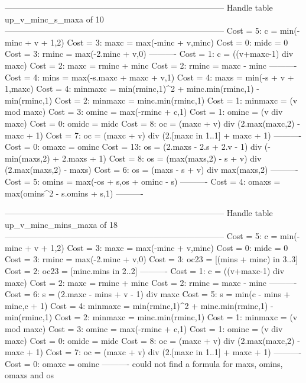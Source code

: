 --------------------------------------------------------------------------------
Handle table up_v_minc_s_maxa of 10
--------------------------------------------------------------------------------
Cost =  5:  c       = min(-minc + v + 1,2)
Cost =  3:  maxc    = max(-minc + v,minc)
Cost =  0:  midc    = 0
Cost =  3:  rminc   = max(-2.minc + v,0)
----------
Cost =  1:  c       = ((v+maxc-1) div maxc)
Cost =  2:  maxc    = rminc + minc
Cost =  2:  rminc   = maxc - minc
----------
Cost =  4:  mins    = max(-s.maxc + maxc + v,1)
Cost =  4:  maxs    = min(-s + v + 1,maxc)
Cost =  4:  minmaxc = min(rminc,1)^2 + minc.min(rminc,1) - min(rminc,1)
Cost =  2:  minmaxc = minc.min(rminc,1)
Cost =  1:  minmaxc = (v mod maxc)
Cost =  3:  ominc   = max(-rminc + c,1)
Cost =  1:  ominc   = (v div maxc)
Cost =  0:  omidc   = midc
Cost =  8:  oc      = (maxc + v) div (2.max(maxc,2) - maxc + 1)
Cost =  7:  oc      = (maxc + v) div (2.[maxc in 1..1] + maxc + 1)
----------
Cost =  0:  omaxc   = ominc
Cost = 13:  os      = (2.maxs - 2.s + 2.v - 1) div (-min(maxs,2) + 2.maxs + 1)
Cost =  8:  os      = (max(maxs,2) - s + v) div (2.max(maxs,2) - maxs)
Cost =  6:  os      = (maxs - s + v) div max(maxs,2)
----------
Cost =  5:  omins   = max(-os + s,os + ominc - s)
----------
Cost =  4:  omaxs   = max(omins^2 - s.omins + s,1)
----------


--------------------------------------------------------------------------------
Handle table up_v_minc_mins_maxa of 18
--------------------------------------------------------------------------------
Cost =  5:  c       = min(-minc + v + 1,2)
Cost =  3:  maxc    = max(-minc + v,minc)
Cost =  0:  midc    = 0
Cost =  3:  rminc   = max(-2.minc + v,0)
Cost =  3:  oc23    = [(mins + minc) in 3..3]
Cost =  2:  oc23    = [minc.mins in 2..2]
----------
Cost =  1:  c       = ((v+maxc-1) div maxc)
Cost =  2:  maxc    = rminc + minc
Cost =  2:  rminc   = maxc - minc
----------
Cost =  6:  s       = (2.maxc - mins + v - 1) div maxc
Cost =  5:  s       = min(c - mins + minc,c + 1)
Cost =  4:  minmaxc = min(rminc,1)^2 + minc.min(rminc,1) - min(rminc,1)
Cost =  2:  minmaxc = minc.min(rminc,1)
Cost =  1:  minmaxc = (v mod maxc)
Cost =  3:  ominc   = max(-rminc + c,1)
Cost =  1:  ominc   = (v div maxc)
Cost =  0:  omidc   = midc
Cost =  8:  oc      = (maxc + v) div (2.max(maxc,2) - maxc + 1)
Cost =  7:  oc      = (maxc + v) div (2.[maxc in 1..1] + maxc + 1)
----------
Cost =  0:  omaxc   = ominc
----------
could not find a formula for maxs, omins, omaxs and os


